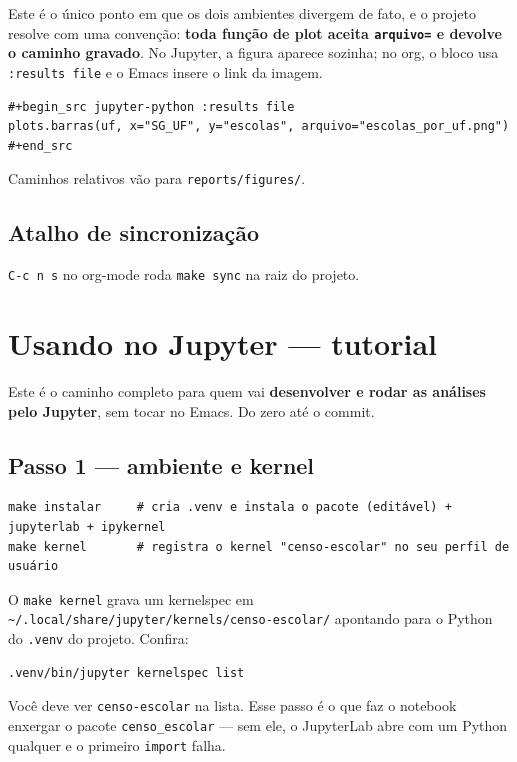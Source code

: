 \documentclass[11pt]{article}
\begin{document}
Este é o único ponto em que os dois ambientes divergem de fato, e o projeto
resolve com uma convenção: \textbf{toda função de plot aceita \texttt{arquivo=} e devolve o
caminho gravado}. No Jupyter, a figura aparece sozinha; no org, o bloco usa
\texttt{:results file} e o Emacs insere o link da imagem.

\begin{verbatim}
#+begin_src jupyter-python :results file
plots.barras(uf, x="SG_UF", y="escolas", arquivo="escolas_por_uf.png")
#+end_src
\end{verbatim}

Caminhos relativos vão para \texttt{reports/figures/}.
\subsection*{Atalho de sincronização}
\label{sec:org73c4d68}

\texttt{C-c n s} no org-mode roda \texttt{make sync} na raiz do projeto.
\section*{Usando no Jupyter — tutorial}
\label{sec:org0566bb2}

Este é o caminho completo para quem vai \textbf{desenvolver e rodar as análises pelo
Jupyter}, sem tocar no Emacs. Do zero até o commit.
\subsection*{Passo 1 — ambiente e kernel}
\label{sec:org4a5af74}

\begin{verbatim}
make instalar     # cria .venv e instala o pacote (editável) + jupyterlab + ipykernel
make kernel       # registra o kernel "censo-escolar" no seu perfil de usuário
\end{verbatim}

O \texttt{make kernel} grava um kernelspec em \texttt{\textasciitilde{}/.local/share/jupyter/kernels/censo-escolar/}
apontando para o Python do \texttt{.venv} do projeto. Confira:

\begin{verbatim}
.venv/bin/jupyter kernelspec list
\end{verbatim}

Você deve ver \texttt{censo-escolar} na lista. Esse passo é o que faz o notebook
enxergar o pacote \texttt{censo\_escolar} — sem ele, o JupyterLab abre com um Python
qualquer e o primeiro \texttt{import} falha.
\end{document}
